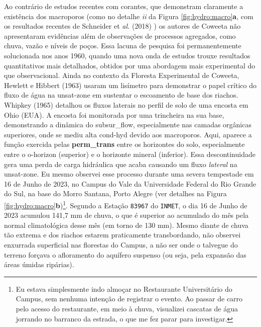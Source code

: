 \documentclass[./main.tex]{subfiles}
\begin{document}
\par Ao contrário de estudos recentes com corantes, que demonstram claramente a existência dos macroporos (como no detalhe \textit{ii} da Figura \ref{fig:hydro:macro}\textbf{a}, com os resultados recentes de Schneider et \textit{al.} (2018) \cite{Schneider2018}) os autores de Coweeta não apresentaram evidências além de observações de processos agregados, como chuva, vazão e níveis de poços. Essa lacuna de pesquisa foi permanentemente solucionada nos anos 1960, quando uma nova onda de estudos trouxe resultados quantitativos mais detalhados, obtidos por uma abordagem mais experimental do que observacional. Ainda no contexto da Floresta Experimental de Coweeta, Hewlett e Hibbert (1963) \cite{Hewlett1963} usaram um lisímetro para demonstrar o papel crítico do fluxo de água na \gls{unsat-zone} em sustentar o escoamento de base dos riachos. Whipkey (1965) \cite{Whipkey1965} detalhou os fluxos laterais no perfil de solo de uma encosta em Ohio (EUA). A encosta foi monitorada por uma trincheira na sua base, demonstrando a dinâmica do \gls{subsur_flow}, especialmente nas camadas orgânicas superiores, onde se mediu alta \gls{cond-hyd} devido aos macroporos. Aqui, aparece a função exercida pelas \textbf{\gls{perm_trans}} entre os horizontes do solo, especialmente entre o \gls{o-horizon} (superior) e o horizonte mineral (inferior). Essa descontinuidade gera uma perda de carga hidráulica que acaba causando um fluxo \textit{lateral} na \gls{unsat-zone}. Eu mesmo observei esse processo durante uma severa tempestade em 16 de Junho de 2023, no Campus do Vale da Universidade Federal do Rio Grande do Sul, na base do Morro Santana, Porto Alegre (ver detalhes na Figura \ref{fig:hydro:macro}\textbf{b})\footnote{Eu estava simplesmente indo almoçar no Restaurante Universitário do Campus, sem nenhuma intenção de registrar o evento. Ao passar de carro pelo acesso do restaurante, em meio à chuva, visualizei cascatas de água jorrando no barranco da estrada, o que me fez parar para investigar.}. Segundo a Estação \texttt{83967} do \texttt{INMET}, o dia 16 de Junho de 2023 acumulou 141,7 mm de chuva, o que é superior ao acumulado do mês pela normal climatológica desse mês (em torno de 130 mm). Mesmo diante de chuva tão extrema e dos riachos estarem praticamente transbordando, não observei enxurrada superficial nas florestas do Campus, a não ser onde o talvegue do terreno forçava o afloramento do aquífero suspenso (ou seja, pela expansão das áreas úmidas ripárias).
\end{document}
